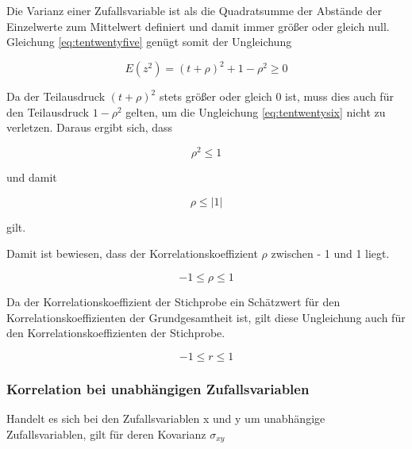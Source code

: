 \noindent Die Varianz einer Zufallsvariable ist als die Quadratsumme der Abst\"{a}nde der Einzelwerte zum Mittelwert definiert und damit immer gr\"{o}{\ss}er oder gleich null. Gleichung \eqref{eq:tentwentyfive} gen\"{u}gt somit der Ungleichung

\begin{equation}\label{eq:tentwentysix}
E(z^{2})=(t+\rho)^{2} +1-\rho ^{2} \ge 0
\end{equation}

\noindent Da der Teilausdruck $(t + \rho)^{2}$ stets gr\"{o}{\ss}er oder gleich 0 ist, muss dies auch f\"{u}r den Teilausdruck $1 - \rho^{2}$ gelten, um die Ungleichung \eqref{eq:tentwentysix} nicht zu verletzen. Daraus ergibt sich, dass

\begin{equation}\label{eq:tentwentyseven}
\rho ^{2} \le 1
\end{equation}

\noindent und damit

\begin{equation}\label{eq:tentwentyeight}
\rho \le \left|1\right|
\end{equation}

\noindent gilt.\newline

\noindent Damit ist bewiesen, dass der Korrelationskoeffizient $\rho$ zwischen - 1 und 1 liegt. 

\begin{equation}\label{eq:tentwentynine}
-1\le \rho \le 1
\end{equation}

\noindent Da der Korrelationskoeffizient der Stichprobe ein Sch\"{a}tzwert f\"{u}r den Korrelationskoeffizienten der Grundgesamtheit ist, gilt diese Ungleichung auch f\"{u}r den Korrelationskoeffizienten der Stichprobe.

\begin{equation}\label{eq:tenthirty}
-1\le r\le 1
\end{equation}

\clearpage

\subsubsection{Korrelation bei unabh\"{a}ngigen Zufallsvariablen}

\noindent Handelt es sich bei den Zufallsvariablen x und y um unabh\"{a}ngige Zufallsvariablen, gilt f\"{u}r deren Kovarianz $\sigma_{xy}$


